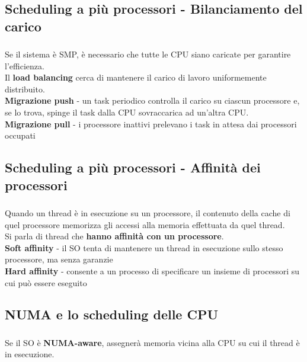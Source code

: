 \documentclass{beamer}
\newenvironment{mainframe}{
	\begin{frame}
		\frametitle{\insertsubsection}
		\framesubtitle{\insertsection}
	}{
	\end{frame}
}
\begin{document}
\subsection{Scheduling a più processori - Bilanciamento del carico}
\begin{mainframe}
	Se il sistema è SMP, è necessario che tutte le CPU siano caricate per garantire l'efficienza.\\
	Il \textbf{load balancing} cerca di mantenere il carico di lavoro uniformemente distribuito.\\
	\textbf{Migrazione push} - un task periodico controlla il carico su ciascun processore e, se lo trova, spinge il task dalla CPU sovraccarica ad un'altra CPU.\\
	\textbf{Migrazione pull} - i processore inattivi prelevano i task in attesa dai processori occupati
\end{mainframe}
\subsection{Scheduling a più processori - Affinità dei processori}
\begin{mainframe}
	Quando un thread è in esecuzione su un processore, il contenuto della cache di quel processore memorizza gli accessi alla memoria effettuata da quel thread.\\
	Si parla di thread che \textbf{hanno affinità con un processore}.\\
	\textbf{Soft affinity} - il SO tenta di mantenere un thread in esecuzione sullo stesso processore, ma senza garanzie\\
	\textbf{Hard affinity} - consente a un processo di specificare un insieme di processori su cui può essere eseguito
\end{mainframe}
\subsection{NUMA e lo scheduling delle CPU}
\begin{mainframe}
	Se il SO è \textbf{NUMA-aware}, assegnerà memoria vicina alla CPU su cui il thread è in esecuzione.
\end{mainframe}
\end{document}

